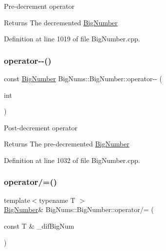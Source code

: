 Pre-\/decrement operator \begin{DoxyReturn}{Returns}
The decremented \mbox{\hyperlink{class_big_nums_1_1_big_number}{Big\+Number}} 
\end{DoxyReturn}


Definition at line 1019 of file Big\+Number.\+cpp.

\mbox{\label{class_big_nums_1_1_big_number_ab6475de98159ef5398b22449f5333368}} 
\subsubsection{\texorpdfstring{operator-\/-\/()}{operator--()}\hspace{0.1cm}{\footnotesize\ttfamily [2/2]}}
{\footnotesize\ttfamily const \mbox{\hyperlink{class_big_nums_1_1_big_number}{Big\+Number}} Big\+Nums\+::\+Big\+Number\+::operator-\/-\/ (\begin{DoxyParamCaption}\item[{int}]{ }\end{DoxyParamCaption})}

Post-\/decrement operator \begin{DoxyReturn}{Returns}
The pre-\/decremented \mbox{\hyperlink{class_big_nums_1_1_big_number}{Big\+Number}} 
\end{DoxyReturn}


Definition at line 1032 of file Big\+Number.\+cpp.

\mbox{\label{class_big_nums_1_1_big_number_adff2df5d7288c36d4ab7dfd0b6f5ede4}} 
\subsubsection{\texorpdfstring{operator/=()}{operator/=()}}
{\footnotesize\ttfamily template$<$typename T $>$ \\
\mbox{\hyperlink{class_big_nums_1_1_big_number}{Big\+Number}}\& Big\+Nums\+::\+Big\+Number\+::operator/= (\begin{DoxyParamCaption}\item[{const T \&}]{\+\_\+dif\+Big\+Num }\end{DoxyParamCaption})\hspace{0.3cm}{\ttfamily [inline]}}

